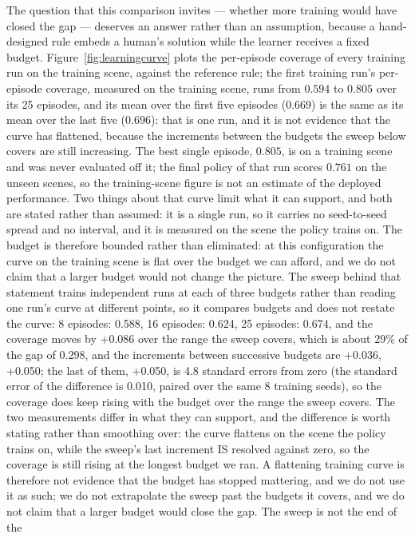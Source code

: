 \documentclass[conference]{IEEEtran}
\begin{document}
The question that this comparison invites --- whether more training would
have closed the gap --- deserves an answer rather than an assumption,
because a hand-designed rule embeds a human's solution while the learner
receives a fixed budget.  Figure~\ref{fig:learningcurve} plots the
per-episode coverage of every training run on the training scene, against
the reference rule; the first training run's per-episode coverage,
measured on the training scene, runs from $0.594$ to
$0.805$ over its 25 episodes, and its mean over
the first five episodes ($0.669$) is the same as its mean over
the last five ($0.696$): that is one run, and it is not evidence
that the curve has flattened, because the increments between the budgets the
sweep below covers are still increasing.  The best single episode,
$0.805$, is on a training scene and was never evaluated off it; the
final policy of that run scores $0.761$ on the unseen scenes, so the training-scene
figure is not an estimate of the deployed performance.  Two things about
that curve limit what it can support, and both are stated rather than
assumed: it is a single run, so it carries no seed-to-seed spread and no
interval, and it is measured on the scene the policy trains on.  The
budget is therefore bounded rather than eliminated: at this configuration
the curve on the training scene is flat over the budget we can afford, and
we do not claim that a larger budget would not change the picture.  The
sweep behind that statement trains independent runs at each of three
budgets rather than reading one
run's curve at different points, so it compares budgets and does not
restate the curve: 8 episodes: 0.588, 16 episodes: 0.624, 25 episodes: 0.674, and the coverage moves by +0.086 over the range the sweep covers, which is about 29\% of the gap of 0.298, and the increments between successive budgets are +0.036, +0.050; the last of them, +0.050, is 4.8 standard errors from zero (the standard error of the difference is 0.010, paired over the same 8 training seeds), so the coverage does keep rising with the budget over the range the sweep covers.  The two
measurements differ in what they can support, and the difference is worth
stating rather than smoothing over: the curve flattens on the scene the
policy trains on, while the sweep's last increment IS resolved against zero, so the coverage is still rising at the longest budget we ran.  A flattening training curve is
therefore not evidence that the budget has stopped mattering, and we do
not use it as such; we do not extrapolate the sweep past the budgets it covers, and we do not claim that a larger budget would close the gap.  The sweep is not the end of the
\end{document}
